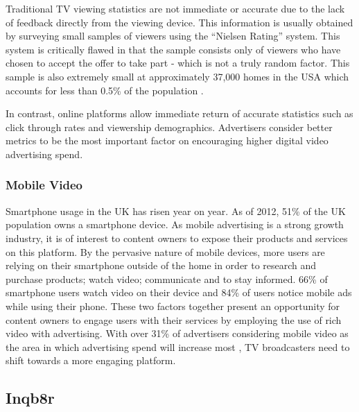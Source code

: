	Traditional TV viewing statistics are not immediate or accurate due to the lack of feedback directly from the viewing device. This information is usually obtained by surveying small samples of viewers using the ``Nielsen Rating'' system. This system is critically flawed in that the sample consists only of viewers who have chosen to accept the offer to take part - which is not a truly random factor. This sample is also extremely small at approximately 37,000 homes in the USA which accounts for less than 0.5\% of the population \citep{nielsen-sample}.

	In contrast, online platforms allow immediate return of accurate statistics such as click through rates and viewership demographics. Advertisers consider better metrics to be the most important factor on encouraging higher digital video advertising spend.

	\subsubsection{Mobile Video}

	Smartphone usage in the UK has risen year on year. As of 2012, 51\% of the UK population owns a smartphone device. As mobile advertising is a strong growth industry, it is of interest to content owners to expose their products and services on this platform. By the pervasive nature of mobile devices, more users are relying on their smartphone outside of the home in order to research and purchase products; watch video; communicate and to stay informed. 66\% of smartphone users watch video on their device and 84\% of users notice mobile ads while using their phone. \citep{mobile-planet} These two factors together present an opportunity for content owners to engage users with their services by employing the use of rich video with advertising. With over 31\% of advertisers considering mobile video as the area in which advertising spend will increase most \citep{brightroll-report}, TV broadcasters need to shift towards a more engaging platform.




	\subsection{Inqb8r}


